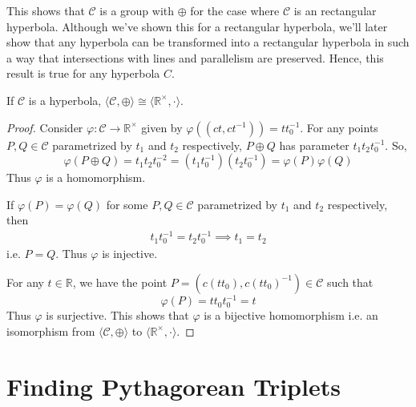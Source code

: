 \noindent
This shows that $\mathcal{C}$ is a group with $\oplus$ for the case where
$\mathcal{C}$ is an rectangular hyperbola. Although we've shown this for a
rectangular hyperbola, we'll later show that any hyperbola can be transformed into
a rectangular hyperbola in such a way that intersections with lines and
parallelism are preserved. Hence, this result is true for any hyperbola $C$.

\begin{theorem}
    If $\mathcal{C}$ is a hyperbola,
    $\langle \mathcal{C},\oplus \rangle \cong \langle \mathbb{R}^\times,\cdot \rangle$.
\end{theorem}

\begin{proof}
    Consider $\varphi:\mathcal{C} \to \mathbb{R}^\times$ given by
    $\varphi((ct,ct^{-1})) = t t_0^{-1}$. For any points
    $P,Q\in\mathcal{C}$ parametrized by $t_1$ and $t_2$ respectively,
    $P \oplus Q$ has parameter $t_1 t_2 t_0^{-1}$. So,
    \[
        \varphi(P \oplus Q) = t_1 t_2 t_0^{-2} = (t_1 t_0^{-1}) (t_2 t_0^{-1})
        = \varphi(P) \varphi(Q)
    \]
    Thus $\varphi$ is a homomorphism.
    \vspace{1ex}

    \noindent
    If $\varphi(P)=\varphi(Q)$ for some $P,Q\in\mathcal{C}$ parametrized by $t_1$ and
    $t_2$ respectively, then
    \begin{align*}
        t_1 t_0^{-1} = t_2 t_0^{-1} \implies t_1 = t_2
    \end{align*}
    i.e. $P=Q$. Thus $\varphi$ is injective.
    \vspace{1ex}

    \noindent
    For any $t \in \mathbb{R}$, we have the point
    $P=(c (t t_0),c (t t_0)^{-1}) \in \mathcal{C}$ such that
    \[ \varphi(P) = t t_0 t_0^{-1} = t \]
    Thus $\varphi$ is surjective. This shows that $\varphi$ is a bijective
    homomorphism i.e. an isomorphism from $\langle \mathcal{C},\oplus \rangle$ to
    $\langle \mathbb{R}^\times,\cdot \rangle$.
\end{proof}

\section{Finding Pythagorean Triplets}

